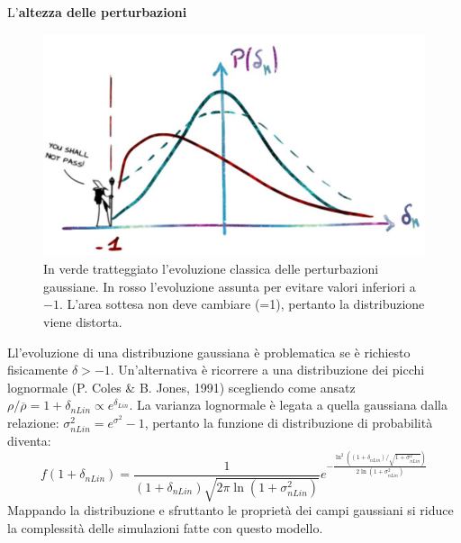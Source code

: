 \vspace{1em}
L'\textbf{altezza delle perturbazioni} 
\begin{figure}[h]
    \centering
    \includegraphics[width=.65 \textwidth]{Pictures/8/pdfevol.jpg}
    \vspace*{-1em}
    \caption{In verde tratteggiato l'evoluzione classica delle perturbazioni gaussiane. In rosso l'evoluzione assunta per evitare valori inferiori a $-1$. L'area sottesa non deve cambiare (=1), pertanto la distribuzione viene distorta.}\label{fig8:ultima}
\end{figure}



Ll'evoluzione di una distribuzione gaussiana è problematica se è richiesto fisicamente $\delta > -1$. Un'alternativa è ricorrere a una distribuzione dei picchi lognormale (P. Coles \& B. Jones, 1991) scegliendo come ansatz $\rho /\overbar{\rho} = 1+\delta_{nLin} \propto e^{\delta_{Lin}}$. La varianza lognormale è legata a quella gaussiana dalla relazione: $\sigma_{nLin}^2 = e^{\sigma^2}-1$, pertanto la funzione di distribuzione di probabilità diventa:
\begin{equation}
    f(1+\delta_{nLin})= \frac{1}{(1+\delta_{nLin})\sqrt{2\pi \ln(1+\sigma_{nLin}^2)}}e^{-\frac{\ln^2\left((1+\delta_{nLin})/\sqrt{1+\sigma_{nLin}^2}\right)}{2 \ln(1+\sigma_{nLin}^2)}}
\end{equation}
Mappando la distribuzione e sfruttanto le proprietà dei campi gaussiani si riduce la complessità delle simulazioni fatte con questo modello. 